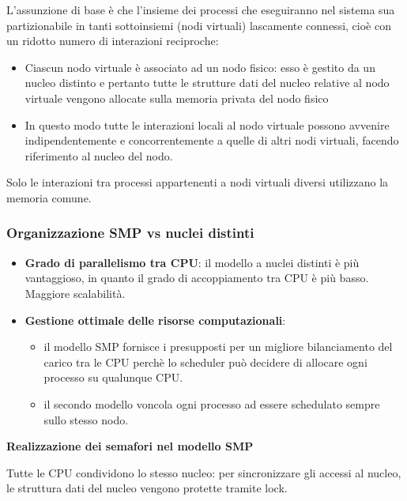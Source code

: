 \documentclass{article}
\begin{document}
L'assunzione di base è che l'insieme dei processi che eseguiranno nel sistema sua partizionabile in tanti sottoinsiemi (nodi virtuali) lascamente connessi, cioè con un ridotto numero di
interazioni reciproche:
\begin{itemize}
    \item Ciascun nodo virtuale è associato ad un nodo fisico: esso è gestito da un nucleo distinto e pertanto tutte le strutture dati del nucleo relative al nodo virtuale vengono allocate
    sulla memoria privata del nodo fisico
    \item In questo modo tutte le interazioni locali al nodo virtuale possono avvenire indipendentemente e concorrentemente a quelle di altri nodi virtuali, facendo riferimento al nucleo del nodo.
\end{itemize}

\vspace{3mm}
Solo le interazioni tra processi appartenenti a nodi virtuali diversi utilizzano la memoria comune.

\subsubsection{Organizzazione SMP vs nuclei distinti}

\begin{itemize}
    \item \textbf{Grado di parallelismo tra CPU}: il modello a nuclei distinti è più vantaggioso, in quanto il grado di accoppiamento tra CPU è più basso. Maggiore scalabilità.
    \item \textbf{Gestione ottimale delle risorse computazionali}: 
    \begin{itemize}
        \item il modello SMP fornisce i presupposti per un migliore bilanciamento del carico tra le CPU perchè lo scheduler può decidere di allocare ogni processo su qualunque CPU.
        \item il secondo modello voncola ogni processo ad essere schedulato sempre sullo stesso nodo.
    \end{itemize}
\end{itemize}

\vspace{5mm}
\textbf{Realizzazione dei semafori nel modello SMP}

Tutte le CPU condividono lo stesso nucleo: per sincronizzare gli accessi al nucleo, le struttura dati del nucleo vengono protette tramite lock.
\end{document}
